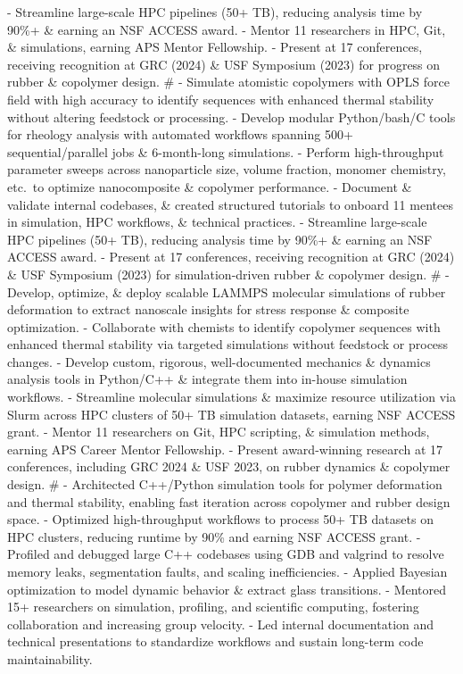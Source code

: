- Streamline large-scale HPC pipelines (50+ TB), reducing analysis time by 90\%+ \& earning an NSF ACCESS award.
- Mentor 11 researchers in HPC, Git, \& simulations, earning APS Mentor Fellowship.
- Present at 17 conferences, receiving recognition at GRC (2024) \& USF Symposium (2023) for progress on rubber \& copolymer design.
#
- Simulate atomistic copolymers with OPLS force field with high accuracy to identify sequences with enhanced thermal stability without altering feedstock or processing.
- Develop modular Python/bash/C tools for rheology analysis with automated workflows spanning 500+ sequential/parallel jobs \& 6-month-long simulations.
- Perform high-throughput parameter sweeps across nanoparticle size, volume fraction, monomer chemistry, etc.~to optimize nanocomposite \& copolymer performance.
- Document \& validate internal codebases, \& created structured tutorials to onboard 11 mentees in simulation, HPC workflows, \& technical practices.
- Streamline large-scale HPC pipelines (50+ TB), reducing analysis time by 90\%+ \& earning an NSF ACCESS award.
- Present at 17 conferences, receiving recognition at GRC (2024) \& USF Symposium (2023) for simulation-driven rubber \& copolymer design.
#
- Develop, optimize, \& deploy scalable LAMMPS molecular simulations of rubber deformation to extract nanoscale insights for stress response \& composite optimization.
- Collaborate with chemists to identify copolymer sequences with enhanced thermal stability via targeted simulations without feedstock or process changes.
- Develop custom, rigorous, well-documented mechanics \& dynamics analysis tools in Python/C++ \& integrate them into in-house simulation workflows.
- Streamline molecular simulations \& maximize resource utilization via Slurm across HPC clusters of 50+ TB simulation datasets, earning NSF ACCESS grant.
- Mentor 11 researchers on Git, HPC scripting, \& simulation methods, earning APS Career Mentor Fellowship.
- Present award-winning research at 17 conferences, including GRC 2024 \& USF 2023, on rubber dynamics \& copolymer design.
#
- Architected C++/Python simulation tools for polymer deformation and thermal stability, enabling fast iteration across copolymer and rubber design space.
- Optimized high-throughput workflows to process 50+ TB datasets on HPC clusters, reducing runtime by 90\% and earning NSF ACCESS grant.
- Profiled and debugged large C++ codebases using GDB and valgrind to resolve memory leaks, segmentation faults, and scaling inefficiencies.
- Applied Bayesian optimization to model dynamic behavior \& extract glass transitions.
- Mentored 15+ researchers on simulation, profiling, and scientific computing, fostering collaboration and increasing group velocity.
- Led internal documentation and technical presentations to standardize workflows and sustain long-term code maintainability.
